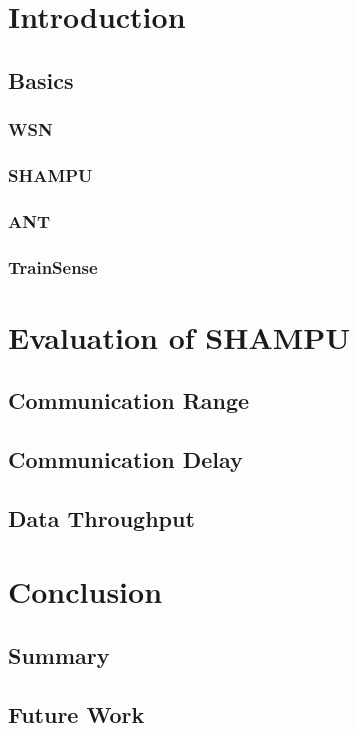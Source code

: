 \chapter{Introduction}

\section{Basics}
\subsection{WSN}
\subsection{SHAMPU}
\subsection{ANT}
\subsection{TrainSense}

\chapter{Evaluation of SHAMPU}
\section{Communication Range}
\section{Communication Delay}
\section{Data Throughput}
\cite{Beutel04}
\cite{Hopkins06}
\cite{Leopold03}
\cite{Lim13}
\cite{Smeets14}
\cite{Smeets13}

\chapter{Conclusion}
\section{Summary}
\section{Future Work}
